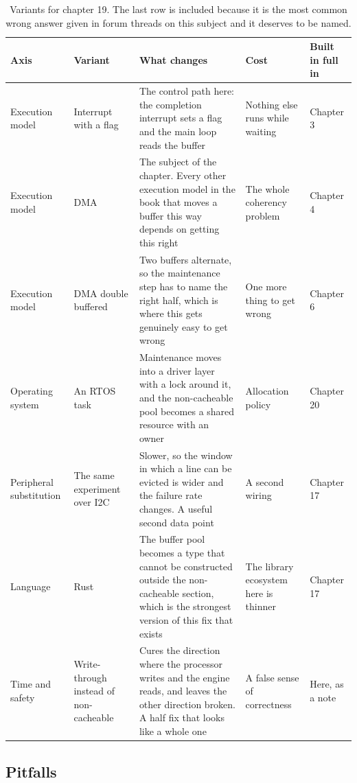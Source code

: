 \begin{table}[H]\centering\small
\begin{tabular}{p{24mm}p{26mm}p{44mm}p{22mm}p{20mm}}
\toprule
Axis & Variant & What changes & Cost & Built in full in \\
\midrule
Execution model & Interrupt with a flag & The control path here: the completion interrupt sets a flag and the main loop reads the buffer & Nothing else runs while waiting & Chapter 3 \\
Execution model & DMA & The subject of the chapter. Every other execution model in the book that moves a buffer this way depends on getting this right & The whole coherency problem & Chapter 4 \\
Execution model & DMA double buffered & Two buffers alternate, so the maintenance step has to name the right half, which is where this gets genuinely easy to get wrong & One more thing to get wrong & Chapter 6 \\
Operating system & An RTOS task & Maintenance moves into a driver layer with a lock around it, and the non-cacheable pool becomes a shared resource with an owner & Allocation policy & Chapter 20 \\
Peripheral substitution & The same experiment over I2C & Slower, so the window in which a line can be evicted is wider and the failure rate changes. A useful second data point & A second wiring & Chapter 17 \\
Language & Rust & The buffer pool becomes a type that cannot be constructed outside the non-cacheable section, which is the strongest version of this fix that exists & The library ecosystem here is thinner & Chapter 17 \\
Time and safety & Write-through instead of non-cacheable & Cures the direction where the processor writes and the engine reads, and leaves the other direction broken. A half fix that looks like a whole one & A false sense of correctness & Here, as a note \\
\bottomrule
\end{tabular}
\caption{Variants for chapter 19. The last row is included because it is the most common wrong answer given in forum threads on this subject and it deserves to be named.}
\end{table}

\subsection*{Pitfalls}

